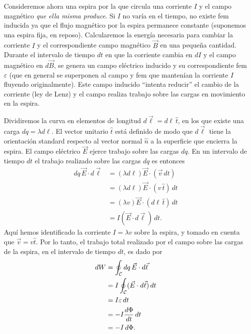 Consideremos ahora una espira por la que circula una corriente $I$ y el campo magnético \textit{que ella misma produce}. Si $I$ no varía en el tiempo, no existe fem inducida ya que el flujo magnético por la espira permanece constante (suponemos una espira fija, en reposo). Calcularemos la energía necesaria para cambiar la corriente $I$ y el correspondiente campo magnético $\vec{B}$ en una pequeña cantidad. Durante el intervalo de tiempo $dt$ en que la corriente cambia en $dI$ y el campo magnético en $d\vec{B}$, se genera un campo eléctrico inducido y su correspondiente fem $\varepsilon$ (que en general se superponen al campo y fem que mantenían la corriente $I$ fluyendo originalmente). Este campo inducido ``intenta reducir'' el cambio de la corriente (ley de Lenz) y el campo realiza trabajo sobre las cargas en movimiento en la espira. 

Dividiremos la curva en elementos de longitud $d\vec{\ell}=d\ell \,\hat{t}$, en los que existe una carga $dq=\lambda d\ell$. El vector unitario $\hat{t}$ está definido de modo que $d\vec{\ell}$ tiene la orientación standard respecto al vector normal $\hat{n}$ a la superficie que encierra la espira. El campo eléctrico $\vec{E}$ ejerce trabajo sobre las cargas $dq$. En un intervalo de tiempo $dt$ el trabajo realizado sobre las cargas $dq$ es entonces 
\begin{align}
dq\,\vec{E}\cdot d\vec{\ell} &= (\lambda d\ell) \vec{E}\cdot (\vec{v}\,dt) \\
&= (\lambda d\ell) \vec{E}\cdot (v\,\hat{t})\,dt \\
&= (\lambda v) \vec{E}\cdot (d\ell\,\hat{t})\,dt \\
&= I(\vec{E}\cdot d\vec{\ell})\,dt.
\end{align}
Aquí hemos identificado la corriente $I=\lambda v$ sobre la espira, y tomado en cuenta que $\vec{v}=v\hat{t}$. Por lo tanto, el trabajo total realizado por el campo sobre las cargas de la espira, en el intervalo de tiempo $dt$, es dado por
\begin{align}
dW &= \oint_{\cal C}dq\,\vec{E}\cdot d\vec{\ell} \\
&= I\oint_{\cal C}(\vec{E}\cdot d\vec{\ell})\,dt \\
&= I\varepsilon\,dt \\
&= -I\frac{d\Phi}{dt}\,dt \\
&= -I\,d\Phi.
\end{align}

